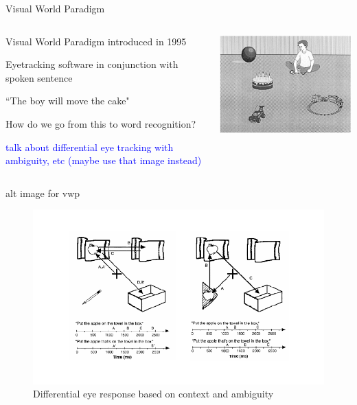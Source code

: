 \documentclass{beamer}
\newcommand{\vp}{\vspace{2mm}}
\providecommand{\cn}[1]{\textcolor{blue}{#1}}
\begin{document}
\begin{frame}{Visual World Paradigm}
\begin{columns}
\begin{column}{0.45\textwidth}

Visual World Paradigm introduced in 1995 \vp

Eyetracking software in conjunction with spoken sentence \vp

``The boy will move the cake" \vp

How do we go from this to word recognition? \vp

\cn{talk about differential eye tracking with ambiguity, etc (maybe use that image instead)}

\end{column}
\begin{column}{0.5\textwidth}  %
\begin{center}
\includegraphics[scale=.9]{img/vwp_classic.png}
\end{center}
\end{column}
\end{columns}
\end{frame}

\begin{frame}{alt image for vwp}
\begin{figure}
\centering
\includegraphics[width=\textwidth]{apple_combine.pdf}
\caption{Differential eye response based on context and ambiguity}
\end{figure}
\end{frame}
\end{document}

